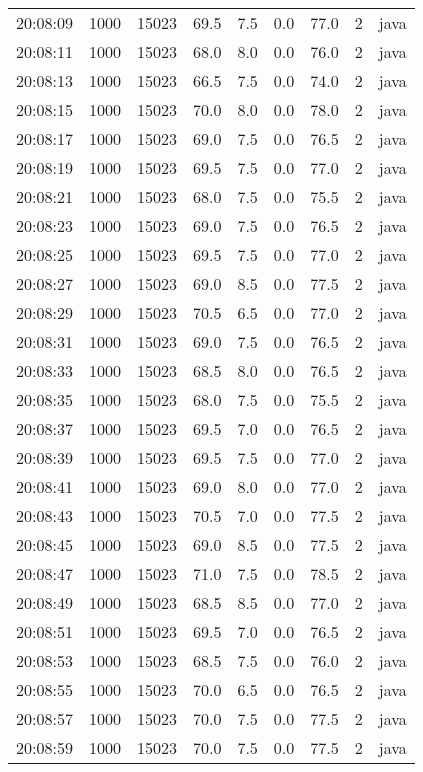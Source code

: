 \documentclass[11pt]{article}
\begin{document}
\begin{table}[htbp]
\begin{tabular}{rrrrrrrrl}
20:08:09 & 1000 & 15023 & 69.5 & 7.5 & 0.0 & 77.0 & 2 & java\\
20:08:11 & 1000 & 15023 & 68.0 & 8.0 & 0.0 & 76.0 & 2 & java\\
20:08:13 & 1000 & 15023 & 66.5 & 7.5 & 0.0 & 74.0 & 2 & java\\
20:08:15 & 1000 & 15023 & 70.0 & 8.0 & 0.0 & 78.0 & 2 & java\\
20:08:17 & 1000 & 15023 & 69.0 & 7.5 & 0.0 & 76.5 & 2 & java\\
20:08:19 & 1000 & 15023 & 69.5 & 7.5 & 0.0 & 77.0 & 2 & java\\
20:08:21 & 1000 & 15023 & 68.0 & 7.5 & 0.0 & 75.5 & 2 & java\\
20:08:23 & 1000 & 15023 & 69.0 & 7.5 & 0.0 & 76.5 & 2 & java\\
20:08:25 & 1000 & 15023 & 69.5 & 7.5 & 0.0 & 77.0 & 2 & java\\
20:08:27 & 1000 & 15023 & 69.0 & 8.5 & 0.0 & 77.5 & 2 & java\\
20:08:29 & 1000 & 15023 & 70.5 & 6.5 & 0.0 & 77.0 & 2 & java\\
20:08:31 & 1000 & 15023 & 69.0 & 7.5 & 0.0 & 76.5 & 2 & java\\
20:08:33 & 1000 & 15023 & 68.5 & 8.0 & 0.0 & 76.5 & 2 & java\\
20:08:35 & 1000 & 15023 & 68.0 & 7.5 & 0.0 & 75.5 & 2 & java\\
20:08:37 & 1000 & 15023 & 69.5 & 7.0 & 0.0 & 76.5 & 2 & java\\
20:08:39 & 1000 & 15023 & 69.5 & 7.5 & 0.0 & 77.0 & 2 & java\\
20:08:41 & 1000 & 15023 & 69.0 & 8.0 & 0.0 & 77.0 & 2 & java\\
20:08:43 & 1000 & 15023 & 70.5 & 7.0 & 0.0 & 77.5 & 2 & java\\
20:08:45 & 1000 & 15023 & 69.0 & 8.5 & 0.0 & 77.5 & 2 & java\\
20:08:47 & 1000 & 15023 & 71.0 & 7.5 & 0.0 & 78.5 & 2 & java\\
20:08:49 & 1000 & 15023 & 68.5 & 8.5 & 0.0 & 77.0 & 2 & java\\
20:08:51 & 1000 & 15023 & 69.5 & 7.0 & 0.0 & 76.5 & 2 & java\\
20:08:53 & 1000 & 15023 & 68.5 & 7.5 & 0.0 & 76.0 & 2 & java\\
20:08:55 & 1000 & 15023 & 70.0 & 6.5 & 0.0 & 76.5 & 2 & java\\
20:08:57 & 1000 & 15023 & 70.0 & 7.5 & 0.0 & 77.5 & 2 & java\\
20:08:59 & 1000 & 15023 & 70.0 & 7.5 & 0.0 & 77.5 & 2 & java\\

\end{tabular}
\end{table}
\end{document}
